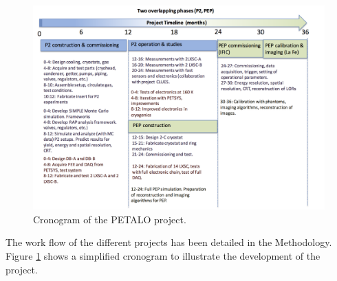 
\begin{figure}[!htb]
	\centering
	\includegraphics[scale=0.7]{img/Crono.png}
	\caption{\label{fig.Crono} Cronogram of the PETALO project.  }
\end{figure}

The work flow of the different projects has been detailed in the Methodology. Figure \ref{fig.Crono} shows a simplified cronogram to illustrate the development of the project.